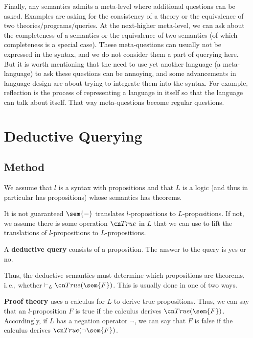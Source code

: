 \begin{remark}
Finally, any semantics admits a meta-level where additional questions can be asked.
Examples are asking for the consistency of a theory or the equivalence of two theories/programs/queries.
At the next-higher meta-level, we can ask about the completeness of a semantics or the equivalence of two semantics (of which completeness is a special case).
These meta-questions can usually not be expressed in the syntax, and we do not consider them a part of querying here.
But it is worth mentioning that the need to use yet another language (a meta-language) to ask these questions can be annoying, and some advancements in language design are about trying to integrate them into the syntax.
For example, reflection is the process of representing a language in itself so that the language can talk about itself.
That way meta-questions become regular questions.
\end{remark}


\section{Deductive Querying}\label{sec:bolquery:ded}

\subsection{Method}

We assume that $l$ is a syntax with propositions and that $L$ is a logic (and thus in particular has propositions) whose semantics has theorems.

It is not guaranteed $\sem{-}$ translates $l$-propositions to $L$-propositions.
If not, we assume there is some operation $\truelift$ in $L$ that we can use to lift the translations of $l$-propositions to $L$-propositions.

A \textbf{deductive query} consists of a proposition.
The answer to the query is yes or no.

Thus, the deductive semantics must determine which propositions are theorems, i.\,e., whether $\vdash_L\truelift(\sem{F})$.
This is usually done in one of two ways.

\textbf{Proof theory} uses a calculus for $L$ to derive true propositions.
Thus, we can say that an $l$-proposition $F$ is true if the calculus derives $\truelift(\sem{F})$.
Accordingly, if $L$ has a negation operator $\neg$, we can say that $F$ is false if the calculus derives $\truelift(\neg\sem{F})$.


